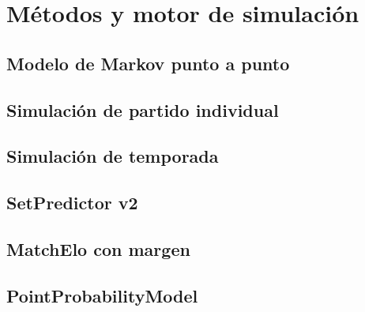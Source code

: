 \chapter{M\'etodos y motor de simulaci\'on}
\label{ch:metodos}

\section{Modelo de Markov punto a punto}
\label{sec:markov-model}

\section{Simulaci\'on de partido individual}
\label{sec:match-sim}

\section{Simulaci\'on de temporada}
\label{sec:season-sim}

\section{SetPredictor v2}
\label{sec:set-predictor}

\section{MatchElo con margen}
\label{sec:match-elo}

\section{PointProbabilityModel}
\label{sec:point-prob}
